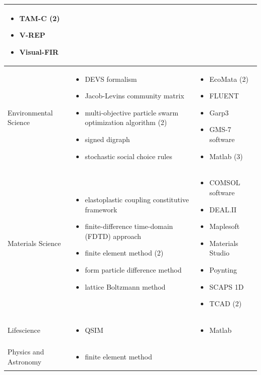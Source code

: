 \documentclass[utf8]{gradu3}
\begin{document}
\begin{longtable}[h]{|p{4cm}|p{6cm}|p{5cm}|}
\begin{itemize}
        \item TAM-C (2)
        \item V-REP
        \item Visual-FIR
    \end{itemize}
    \\
    \hline
    Environmental Science & \begin{itemize}
        \item DEVS formalism
        \item Jacob-Levins community matrix
        \item multi-objective particle swarm optimization algorithm (2)
        \item signed digraph
        \item stochastic social choice rules
    \end{itemize} &
    \begin{itemize}
        \item EcoMata (2)
        \item FLUENT
        \item Garp3
        \item GMS-7 software
        \item Matlab (3)
    \end{itemize}
    \\
    \hline
    Materials Science & \begin{itemize}
        \item elastoplastic coupling constitutive framework
        \item finite-difference time-domain (FDTD) approach
        \item finite element method (2)
        \item form particle difference method
        \item lattice Boltzmann method
    \end{itemize} &
    \begin{itemize}
        \item COMSOL software
        \item DEAL.II 
        \item Maplesoft
        \item Materials Studio
        \item Poynting
        \item SCAPS 1D
        \item TCAD (2)
    \end{itemize}
    \\
    \hline
    Lifescience & \begin{itemize}
        \item QSIM
    \end{itemize} &
    \begin{itemize}
        \item Matlab
    \end{itemize}
    \\
    \hline
    Physics and Astronomy & \begin{itemize}
        \item finite element method
    \end{itemize} &
    

\end{longtable}
\end{document}
